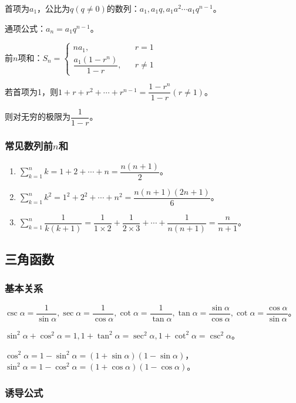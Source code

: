 \documentclass[UTF8, 12pt]{ctexart}
\begin{document}
首项为$a_1$，公比为$q(q\neq 0)$的数列：$a_1,a_1q,a_1a^2\cdots a_1q^{n-1}$。

通项公式：$a_n=a_1q^{n-1}$。

前$n$项和：$S_n=
    \left\{
    \begin{array}{lcl}
        na_1,                   &  & r=1     \\
        \dfrac{a_1(1-r^n)}{1-r}, &  & r\neq 1
    \end{array}
    \right.$

若首项为1，则$1+r+r^2+\cdots+r^{n-1}=\dfrac{1-r^n}{1-r}(r\neq 1)$。

则对无穷的极限为$\dfrac{1}{1-r}$。

\subsubsection{常见数列前\texorpdfstring{$n$}项和}

\begin{enumerate}
    \item $\sum_{k=1}^nk=1+2+\cdots+n=\dfrac{n(n+1)}{2}$。
    \item $\sum_{k=1}^nk^2=1^2+2^2+\cdots+n^2=\dfrac{n(n+1)(2n+1)}{6}$。
    \item $\sum_{k=1}^n\dfrac{1}{k(k+1)}=\dfrac{1}{1\times 2}+\dfrac{1}{2\times 3}+\cdots+\dfrac{1}{n(n+1)}=\dfrac{n}{n+1}$。
\end{enumerate}

\subsection{三角函数}

\subsubsection{基本关系}

$\csc\alpha=\dfrac{1}{\sin\alpha},\sec\alpha=\dfrac{1}{\cos\alpha},\cot\alpha=\dfrac{1}{\tan\alpha},\tan\alpha=\dfrac{\sin\alpha}{\cos\alpha},\cot\alpha=\dfrac{\cos\alpha}{\sin\alpha}$。

$\sin^2\alpha+\cos^2\alpha=1,1+\tan^2\alpha=\sec^2\alpha,1+\cot^2\alpha=\csc^2\alpha$。

$\cos^2\alpha=1-\sin^2\alpha=(1+\sin\alpha)(1-\sin\alpha)$，$\sin^2\alpha=1-\cos^2\alpha=(1+\cos\alpha)(1-\cos\alpha)$。

\subsubsection{诱导公式}
\end{document}
